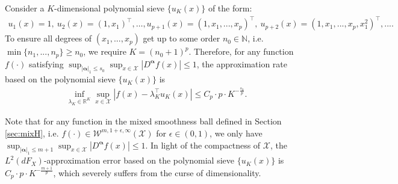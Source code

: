 \documentclass[11pt]{article}
\numberwithin{equation}{section}
\begin{document}
  Consider a $K$-dimensional polynomial sieve $\{u_K(x)\}$ of the form:
\begin{align*}
	u_1(x)=1,\ u_2(x)=(
	1, x_1)^\top,\ldots, u_{p+1}(x)=(
	1, x_1,...,x_p
	)^\top, \ u_{p+2}(x)=(
	1, x_1,...,x_p,x_1^2)^\top,....
\end{align*}
To ensure all degrees of $(x_1,...,x_p)$ get up to some order $n_0\in\mathbb{N}$, i.e. $\min\{n_1,...,n_p\}\geq n_0$, we require $K=(n_0+1)^p$. Therefore, for any function $f(\cdot)$ satisfying $\sup_{|\boldsymbol{\alpha}|_1\leq s_0 }\sup_{x\in\mathcal{X}}|D^{\boldsymbol{\alpha}}f(x)|\leq 1$, the approximation rate based on the polynomial sieve $\{u_K(x)\}$ is
\begin{align*}
	\inf_{\lambda_K\in\mathbb{R}^K}\sup_{x\in \mathcal{X}}|	f(x)-\lambda^\top_{K}u_K(x)|\leq  C_p\cdot p\cdot K^{-\frac{s_0}{p}}.
\end{align*}


Note that for any function in the mixed smoothness ball defined in Section \ref{sec:mixH}, i.e. $f(\cdot)\in\mathcal{W}^{m,1+\epsilon,\infty}(\mathcal{X})$ for $\epsilon\in (0,1)$, we  only have
$\sup_{|\boldsymbol{\alpha}|_1\leq m+1 }\sup_{x\in\mathcal{X}}|D^{\boldsymbol{\alpha}}f(x)|\leq 1$. In light of the compactness of $\mathcal{X}$, the $L^2(dF_X)$-approximation error based on the polynomial sieve $\{u_K(x)\}$ is $C_p\cdot p\cdot K^{-\frac{m+1}{p}}$, which severely suffers from the  curse of dimensionality.
\end{document}

